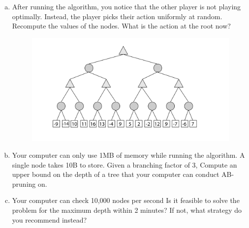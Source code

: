 \documentclass[a4paper]{article}
\begin{document}
\begin{enumerate}[(a)]
\newpage

\item After running the algorithm, you notice that the other player is not playing optimally. Instead, the player picks their action uniformly at random. Recompute the values of the nodes. What is the action at the root now? 

\begin{center}
\begin{figure}[h!]
\centering
\includegraphics[width=1.25\textwidth]{figs/expectimax}
\end{figure}
\end{center}


\item Your computer can only use 1MB of memory while running the algorithm. A single node takes 10B to store. Given a branching factor of 3, Compute an upper bound on the depth of a tree that your computer can conduct AB-pruning on.

\vspace{10em}

\item Your computer can check 10,000 nodes per second Is it feasible to solve the problem for the maximum depth within 2 minutes? If not, what strategy do you recommend instead?

\vspace{10em}


\end{enumerate}
\end{document}
